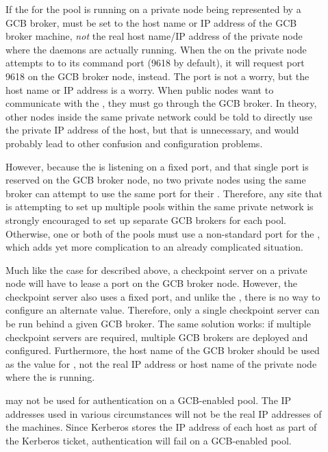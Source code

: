 \begin{description}


\item[]
  If the  for the pool is running on a private node
  being represented by a GCB broker, 
  must be set to the host name or IP address of the GCB broker machine,
  \emph{not} the real host name/IP address of the private node
  where the daemons are actually running.
  When the  on the private node attempts to
   to its command port (9618 by default), it will
  request port 9618 on the GCB broker node, instead.
  The port is not a worry, but the host name or IP address 
  is a worry.
  When public nodes want to communicate with the ,
  they must go through the GCB broker.
  In theory, other nodes inside the same private network could be told
  to directly use the private IP address of the  host,
  but that is
  unnecessary, and would probably lead to other confusion and
  configuration problems.

  However, because the  is listening on a fixed
  port, and that single port is reserved on the GCB broker node, no
  two private nodes using the same broker can attempt to use the same
  port for their .
  Therefore, any site that is attempting to set up multiple pools
  within the same private network is strongly encouraged to set up
  separate GCB brokers for each pool.
  Otherwise, one or both of the pools must use a
  non-standard port for the , which adds yet more
  complication to an already complicated situation. 

\item[]
  Much like the case for  described above,
  a checkpoint server on a private node will have to lease a port on
  the GCB broker node.
  However, the checkpoint server also uses a fixed port, and unlike
  the , there is no way to configure an alternate
  value.
  Therefore, only a single checkpoint server can be run behind a given
  GCB broker.
  The same solution works: if multiple checkpoint servers are required,
  multiple
  GCB brokers are deployed and configured.
  Furthermore, the host name of the GCB broker should be used as the
  value for , not the real IP address or host name
  of the private node where the  is running.

\item[]
  \verb@KERBEROS@ may not be used for authentication
  on a GCB-enabled pool.
  The IP addresses used in various
  circumstances will not be the real IP addresses of the machines.
  Since Kerberos stores the IP address of each host as part of the
  Kerberos ticket, authentication will fail on a GCB-enabled
  pool.

\end{description}

